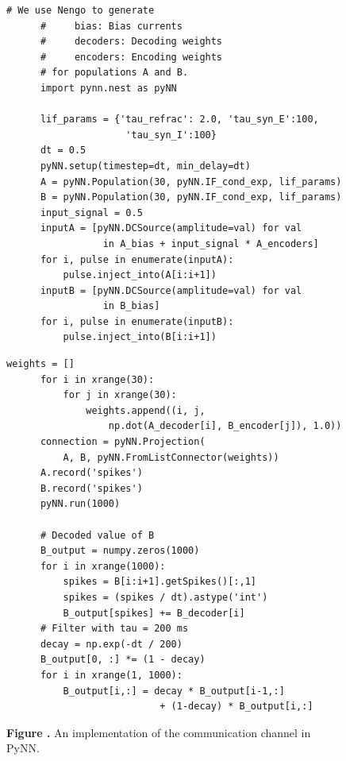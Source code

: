 \documentclass{frontiersSCNS}
\begin{document}
\begin{figure}
\begin{center}
  \begin{minipage}{.495\textwidth}
    \begin{lstlisting}[basicstyle={\footnotesize\ttfamily}]
      # We use Nengo to generate
      #     bias: Bias currents
      #     decoders: Decoding weights
      #     encoders: Encoding weights
      # for populations A and B.
      import pynn.nest as pyNN

      lif_params = {'tau_refrac': 2.0, 'tau_syn_E':100,
                     'tau_syn_I':100}
      dt = 0.5
      pyNN.setup(timestep=dt, min_delay=dt)
      A = pyNN.Population(30, pyNN.IF_cond_exp, lif_params)
      B = pyNN.Population(30, pyNN.IF_cond_exp, lif_params)
      input_signal = 0.5
      inputA = [pyNN.DCSource(amplitude=val) for val
                 in A_bias + input_signal * A_encoders]
      for i, pulse in enumerate(inputA):
          pulse.inject_into(A[i:i+1])
      inputB = [pyNN.DCSource(amplitude=val) for val
                 in B_bias]
      for i, pulse in enumerate(inputB):
          pulse.inject_into(B[i:i+1])
    \end{lstlisting}
  \end{minipage}
  \begin{minipage}{.495\textwidth}
    \begin{lstlisting}[basicstyle={\footnotesize\ttfamily}]
      weights = []
      for i in xrange(30):
          for j in xrange(30):
              weights.append((i, j,
                  np.dot(A_decoder[i], B_encoder[j]), 1.0))
      connection = pyNN.Projection(
          A, B, pyNN.FromListConnector(weights))
      A.record('spikes')
      B.record('spikes')
      pyNN.run(1000)

      # Decoded value of B
      B_output = numpy.zeros(1000)
      for i in xrange(1000):
          spikes = B[i:i+1].getSpikes()[:,1]
          spikes = (spikes / dt).astype('int')
          B_output[spikes] += B_decoder[i]
      # Filter with tau = 200 ms
      decay = np.exp(-dt / 200)
      B_output[0, :] *= (1 - decay)
      for i in xrange(1, 1000):
          B_output[i,:] = decay * B_output[i-1,:]
                           + (1-decay) * B_output[i,:]
    \end{lstlisting}
  \end{minipage}
\end{center}
 \textbf{\label{fig:pynn} Figure .}{
   An implementation of the communication channel in PyNN.}
\end{figure}
\end{document}
